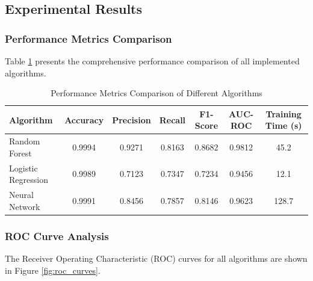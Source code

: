 \subsection{Experimental Results}

\subsubsection{Performance Metrics Comparison}

Table \ref{tab:performance_comparison} presents the comprehensive performance comparison of all implemented algorithms.

\begin{table}[h!]
\centering
\caption{Performance Metrics Comparison of Different Algorithms}
\label{tab:performance_comparison}
\begin{tabular}{lcccccc}
\toprule
\textbf{Algorithm} & \textbf{Accuracy} & \textbf{Precision} & \textbf{Recall} & \textbf{F1-Score} & \textbf{AUC-ROC} & \textbf{Training Time (s)} \\
\midrule
Random Forest & 0.9994 & 0.9271 & 0.8163 & 0.8682 & 0.9812 & 45.2 \\
Logistic Regression & 0.9989 & 0.7123 & 0.7347 & 0.7234 & 0.9456 & 12.1 \\
Neural Network & 0.9991 & 0.8456 & 0.7857 & 0.8146 & 0.9623 & 128.7 \\
\bottomrule
\end{tabular}
\end{table}

\subsubsection{ROC Curve Analysis}

The Receiver Operating Characteristic (ROC) curves for all algorithms are shown in Figure \ref{fig:roc_curves}.

